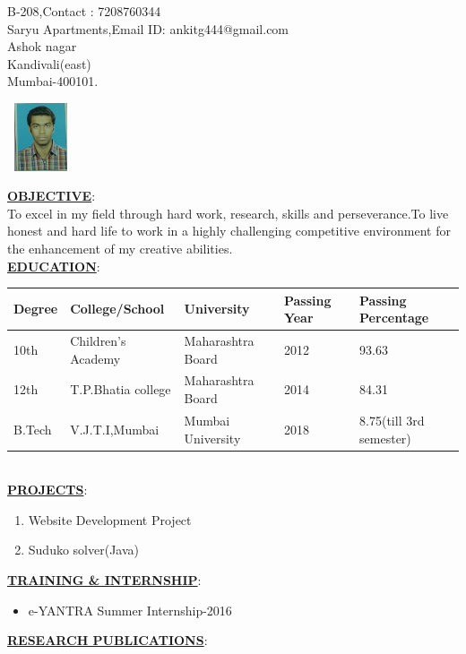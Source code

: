 \documentclass[a4paper,12pt]{article}
\begin{document}
\noindent\makebox[\linewidth]{\rule{170mm}{0.4pt}}
\begin{flushleft}
{B-208,\hfill{Contact : 7208760344} \\ Saryu Apartments,\hfill{Email ID: ankitg444@gmail.com}\\Ashok nagar\\Kandivali(east) \\Mumbai-400101.}
\end{flushleft}
\hfill\includegraphics[width=20mm,height=20mm]{Untitled}\\[1cm]
\begin{flushleft}

\underline{\textbf{OBJECTIVE}}:\\
To excel in my field through hard work, research, skills and perseverance.To live honest and hard life to work in a highly challenging competitive environment for the enhancement of my creative abilities.\\[0.5cm]

\underline{\textbf{EDUCATION}}:\\[0.5cm]
\begin{tabular}{ | m{2.5cm} | m{3cm}| m{2.5cm} | m{2.5cm}| m{3cm} | } 
\hline
Degree& College/School & University & Passing Year & Passing Percentage \\ 
\hline
10th & Children's Academy & Maharashtra Board & 2012 & 93.63 \\ 
\hline
12th & T.P.Bhatia college & Maharashtra Board & 2014 &84.31 \\ 
\hline
B.Tech & V.J.T.I,Mumbai & Mumbai University &2018 & 8.75(till 3rd semester) \\
\hline
\end{tabular}\\[0.5cm]
\underline{\textbf{PROJECTS}}:\\[0.5cm]
\begin{enumerate}
    \item {Website Development Project }
    \item{Suduko solver(Java)}
\end{enumerate}
\underline{\textbf{TRAINING \& INTERNSHIP}}:\\[0.5cm]
\begin{itemize}
 \item{e-YANTRA Summer Internship-2016}
\end{itemize}
\underline{\textbf{RESEARCH PUBLICATIONS}}:\\[0.5cm]
\end{flushleft}
\end{document}
